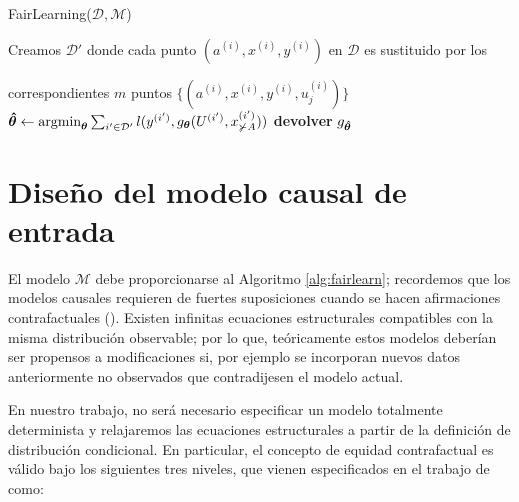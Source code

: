 \documentclass[oneside,openright,titlepage,numbers=noenddot,openany,headinclude,footinclude=true,
cleardoublepage=empty,abstractoff,BCOR=5mm,paper=a4,fontsize=12pt,main=spanish]{scrreprt}
\begin{document}
\begin{algorithm}[h]
\caption{FairLearning($\mathcal{D},\mathcal{M}$)}
\label{alg:fairlearn}
    Creamos $\mathcal{D}'$ donde cada punto $(a^{(i)},x^{(i)},y^{(i)})$ en $\mathcal{D}$ es sustituido por los 
    
    correspondientes $m$ puntos $\{(a^{(i)},x^{(i)},y^{(i)},u_j^{(i)})\}$\;
    $\bm{\hat{\theta}} \leftarrow \text{argmin}_{\bm{\theta}} \sum_{i'\in \mathcal{D}'} l(y^{(i')},g_{\bm{\theta}}(U^{(i')},x_{\not \succ A}^{(i')}))$\;
   \textbf{devolver} $g_{\bm{\hat{\theta}}}$\;
\end{algorithm}

\section{Diseño del modelo causal de entrada}

\label{sec:modeloentrada}

El modelo $\mathcal{M}$ debe proporcionarse al Algoritmo \ref{alg:fairlearn}; recordemos que los modelos causales requieren de fuertes suposiciones cuando se hacen afirmaciones contrafactuales (\cite{fairnesslearning2019}). Existen infinitas ecuaciones estructurales compatibles con la misma distribución observable; por lo que, teóricamente estos modelos deberían ser propensos a modificaciones si, por ejemplo se incorporan nuevos datos anteriormente no observados que contradijesen el modelo actual.

En nuestro trabajo, no será necesario especificar un modelo totalmente determinista y relajaremos las ecuaciones estructurales a partir de la definición de distribución condicional. En particular, el concepto de equidad contrafactual es válido bajo los siguientes tres niveles, que vienen especificados en el trabajo de \cite{counterfactual2018} como:
\end{document}
